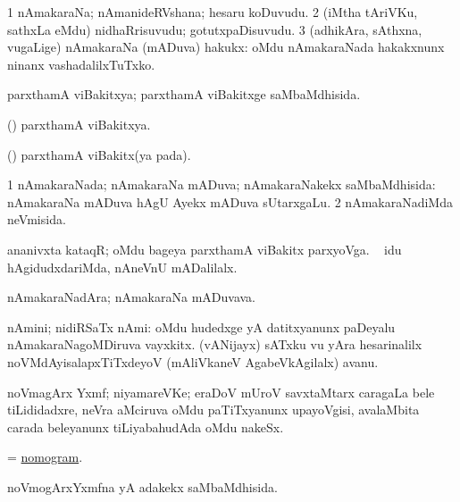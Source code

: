 \bentry
{}
\gl{\nA}
\bmng
\bnum
\num{1} nAmakaraNa; nAmanideRVshana; hesaru koDuvudu. 
\num{2} (iMtha tAriVKu, sathxLa eMdu) nidhaRrisuvudu; gotutxpaDisuvudu. 
\num{3} (adhikAra, sAthxna, \mo vugaLige) nAmakaraNa (mADuva) hakukx:  oMdu nAmakaraNada hakakxnunx ninanx vashadalilxTuTxko. 
\enum
\emng
\eentry

\bentry
{}
\gl{\gu}
\bmng
parxthamA viBakitxya; parxthamA viBakitxge saMbaMdhisida. 
\emng
\eentry

\bentry
{}
\gl{\gu}
\bmng
(\vAyx) parxthamA viBakitxya. 
\emng
\eentry

\bentry
{}
\gl{\nA}
\bmng
(\vAyx) parxthamA viBakitx(ya pada). 
\emng
\eentry

\bentry
{}
\gl{\gu}
\bmng
\bnum
\num{1} nAmakaraNada; nAmakaraNa mADuva; nAmakaraNakekx saMbaMdhisida:  nAmakaraNa mADuva hAgU Ayekx mADuva sUtarxgaLu. 
\num{2} nAmakaraNadiMda neVmisida. 
\enum
\emng
\eentry

\bentry
{}
\gl{\nA}
\bmng
ananivxta kataqR; oMdu bageya parxthamA viBakitx parxyoVga. \udA\  idu hAgidudxdariMda, nAneVnU mADalilalx. 
\emng
\eentry

\bentry
{}
\gl{\nA}
\bmng
nAmakaraNadAra; nAmakaraNa mADuvava. 
\emng
\eentry

\bentry
{}
\gl{\nA}
\bmng
nAmini; nidiRSaTx nAmi: 
\banum
{} oMdu hudedxge yA datitxyanunx paDeyalu nAmakaraNagoMDiruva vayxkitx. 
 (vANijayx) sATxku \mo vu yAra hesarinalilx noVMdAyisalapxTiTxdeyoV (mAliVkaneV AgabeVkAgilalx) avanu. 
\eanum
\emng
\eentry

\bentry
{}
\gl{\nA}
\bmng
noVmagArx Yxmf; niyamareVKe; eraDoV mUroV savxtaMtarx caragaLa bele tiLididadxre, neVra aMciruva oMdu paTiTxyanunx upayoVgisi, avalaMbita carada beleyanunx tiLiyabahudAda oMdu nakeSx. 
\emng
\eentry

\bentry
{}
\gl{\nA}
\bmng
= \hyperlink{nomogram}{nomogram}. 
\emng
\eentry

\bentry
{}
\gl{\gu}
\bmng
noVmogArxYxmfna yA adakekx saMbaMdhisida. 
\emng
\eentry

